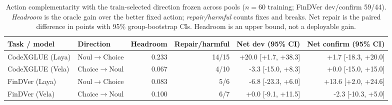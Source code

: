 \begin{table}[t]
\centering
\footnotesize
\caption{Action complementarity with the train-selected direction frozen across
pools ($n=60$ training; FinDVer dev/confirm 59/44). \emph{Headroom} is the
oracle gain over the better fixed action; \emph{repair/harmful} counts fixes and
breaks. Net repair is the paired difference in points with 95\% group-bootstrap
CIs. Headroom is an upper bound, not a deployable gain.}
\label{tab:complementarity}
\begin{tabular}{@{}llrrrr@{}}
\toprule
Task / model & Direction & Headroom & Repair/harmful & Net dev (95\% CI) & Net confirm (95\% CI) \\
\midrule
CodeXGLUE (Laya) & Noul$\to$Choice & 0.233 & 14/15 & +20.0 [+1.7, +38.3] & +1.7 [-18.3, +20.0] \\
CodeXGLUE (Vela) & Choice$\to$Noul & 0.067 & 4/10 & -3.3 [-15.0, +8.3] & +0.0 [-15.0, +15.0] \\
FinDVer (Laya) & Noul$\to$Choice & 0.083 & 5/6 & -6.8 [-23.3, +6.0] & +13.6 [+2.0, +24.6] \\
FinDVer (Vela) & Choice$\to$Noul & 0.100 & 6/7 & +0.0 [-9.1, +11.5] & -2.3 [-10.3, +5.0] \\
\bottomrule
\end{tabular}
\end{table}
